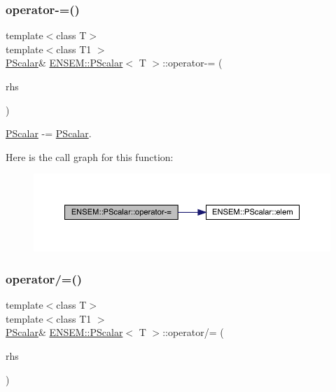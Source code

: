 \subsubsection{\texorpdfstring{operator-\/=()}{operator-=()}\hspace{0.1cm}{\footnotesize\ttfamily [3/3]}}
{\footnotesize\ttfamily template$<$class T$>$ \\
template$<$class T1 $>$ \\
\mbox{\hyperlink{classENSEM_1_1PScalar}{P\+Scalar}}\& \mbox{\hyperlink{classENSEM_1_1PScalar}{E\+N\+S\+E\+M\+::\+P\+Scalar}}$<$ T $>$\+::operator-\/= (\begin{DoxyParamCaption}\item[{const \mbox{\hyperlink{classENSEM_1_1PScalar}{P\+Scalar}}$<$ T1 $>$ \&}]{rhs }\end{DoxyParamCaption})\hspace{0.3cm}{\ttfamily [inline]}}



\mbox{\hyperlink{classENSEM_1_1PScalar}{P\+Scalar}} -\/= \mbox{\hyperlink{classENSEM_1_1PScalar}{P\+Scalar}}. 

Here is the call graph for this function\+:
\nopagebreak
\begin{figure}[H]
\begin{center}
\leavevmode
\includegraphics[width=350pt]{d3/d27/classENSEM_1_1PScalar_a8c0e633dbd87bcb922496bfaf136752c_cgraph}
\end{center}
\end{figure}
\mbox{\label{classENSEM_1_1PScalar_a72bf5e7494fc6c8831d0003f8fb62a16}} 
\subsubsection{\texorpdfstring{operator/=()}{operator/=()}\hspace{0.1cm}{\footnotesize\ttfamily [1/3]}}
{\footnotesize\ttfamily template$<$class T$>$ \\
template$<$class T1 $>$ \\
\mbox{\hyperlink{classENSEM_1_1PScalar}{P\+Scalar}}\& \mbox{\hyperlink{classENSEM_1_1PScalar}{E\+N\+S\+E\+M\+::\+P\+Scalar}}$<$ T $>$\+::operator/= (\begin{DoxyParamCaption}\item[{const \mbox{\hyperlink{classENSEM_1_1PScalar}{P\+Scalar}}$<$ T1 $>$ \&}]{rhs }\end{DoxyParamCaption})\hspace{0.3cm}{\ttfamily [inline]}}



